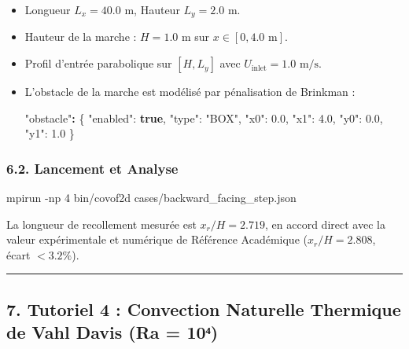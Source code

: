 \documentclass[
  french,
]{article}
\newenvironment{Shaded}{}{}
\newcommand{\AttributeTok}[1]{\textcolor[rgb]{0.49,0.56,0.16}{#1}}
\newcommand{\DataTypeTok}[1]{\textcolor[rgb]{0.56,0.13,0.00}{#1}}
\newcommand{\ErrorTok}[1]{\textcolor[rgb]{1.00,0.00,0.00}{\textbf{#1}}}
\newcommand{\ExtensionTok}[1]{#1}
\newcommand{\FloatTok}[1]{\textcolor[rgb]{0.25,0.63,0.44}{#1}}
\newcommand{\FunctionTok}[1]{\textcolor[rgb]{0.02,0.16,0.49}{#1}}
\newcommand{\KeywordTok}[1]{\textcolor[rgb]{0.00,0.44,0.13}{\textbf{#1}}}
\newcommand{\NormalTok}[1]{#1}
\newcommand{\StringTok}[1]{\textcolor[rgb]{0.25,0.44,0.63}{#1}}
\begin{document}
\begin{itemize}
\item
  Longueur \(L_x = 40.0\text{ m}\), Hauteur \(L_y = 2.0\text{ m}\).
\item
  Hauteur de la marche : \(H = 1.0\text{ m}\) sur
  \(x \in [0, 4.0\text{ m}]\).
\item
  Profil d'entrée parabolique sur \([H, L_y]\) avec
  \(U_{\text{inlet}} = 1.0\text{ m/s}\).
\item
  L'obstacle de la marche est modélisé par pénalisation de Brinkman :

\begin{Shaded}
\begin{Highlighting}[]
\StringTok{"obstacle"}\ErrorTok{:} \FunctionTok{\{}
  \DataTypeTok{"enabled"}\FunctionTok{:} \KeywordTok{true}\FunctionTok{,}
  \DataTypeTok{"type"}\FunctionTok{:} \StringTok{"BOX"}\FunctionTok{,}
  \DataTypeTok{"x0"}\FunctionTok{:} \FloatTok{0.0}\FunctionTok{,} \DataTypeTok{"x1"}\FunctionTok{:} \FloatTok{4.0}\FunctionTok{,}
  \DataTypeTok{"y0"}\FunctionTok{:} \FloatTok{0.0}\FunctionTok{,} \DataTypeTok{"y1"}\FunctionTok{:} \FloatTok{1.0}
\FunctionTok{\}}
\end{Highlighting}
\end{Shaded}
\end{itemize}

\subsubsection{6.2. Lancement et Analyse}\label{lancement-et-analyse}

\begin{Shaded}
\begin{Highlighting}[]
\ExtensionTok{mpirun} \AttributeTok{{-}np}\NormalTok{ 4 bin/covof2d cases/backward\_facing\_step.json}
\end{Highlighting}
\end{Shaded}

La longueur de recollement mesurée est \(x_r / H = 2.719\), en accord
direct avec la valeur expérimentale et numérique de Référence Académique
(\(x_r / H = 2.808\), écart \(< 3.2\%\)).

\begin{center}\rule{0.5\linewidth}{0.5pt}\end{center}

\subsection{7. Tutoriel 4 : Convection Naturelle Thermique de Vahl Davis
(Ra =
10⁴)}\label{tutoriel-4-convection-naturelle-thermique-de-vahl-davis-ra-10ux2074}
\end{document}
